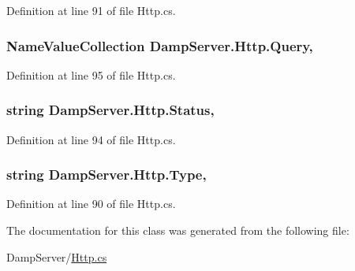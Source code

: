 Definition at line 91 of file Http.\-cs.

\hypertarget{class_damp_server_1_1_http_a1e9e9e3e91c917658aaa831190cac5b0}{
\subsubsection[{Query}]{\setlength{\rightskip}{0pt plus 5cm}Name\-Value\-Collection Damp\-Server.\-Http.\-Query\hspace{0.3cm}{\ttfamily [get]}, {\ttfamily [set]}}}\label{class_damp_server_1_1_http_a1e9e9e3e91c917658aaa831190cac5b0}


Definition at line 95 of file Http.\-cs.

\hypertarget{class_damp_server_1_1_http_a9a9b29df4c279c6a1adb5f0de32977e7}{
\subsubsection[{Status}]{\setlength{\rightskip}{0pt plus 5cm}string Damp\-Server.\-Http.\-Status\hspace{0.3cm}{\ttfamily [get]}, {\ttfamily [set]}}}\label{class_damp_server_1_1_http_a9a9b29df4c279c6a1adb5f0de32977e7}


Definition at line 94 of file Http.\-cs.

\hypertarget{class_damp_server_1_1_http_a2534b03e83104042dc674a4c397f85ad}{
\subsubsection[{Type}]{\setlength{\rightskip}{0pt plus 5cm}string Damp\-Server.\-Http.\-Type\hspace{0.3cm}{\ttfamily [get]}, {\ttfamily [set]}}}\label{class_damp_server_1_1_http_a2534b03e83104042dc674a4c397f85ad}


Definition at line 90 of file Http.\-cs.



The documentation for this class was generated from the following file\-:\begin{DoxyCompactItemize}
\item 
Damp\-Server/\hyperlink{_http_8cs}{Http.\-cs}\end{DoxyCompactItemize}
